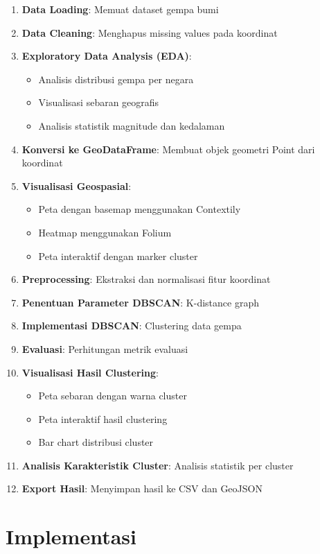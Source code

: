 \documentclass[12pt,a4paper]{article}
\begin{document}
\begin{enumerate}
    \item \textbf{Data Loading}: Memuat dataset gempa bumi
    \item \textbf{Data Cleaning}: Menghapus missing values pada koordinat
    \item \textbf{Exploratory Data Analysis (EDA)}:
    \begin{itemize}
        \item Analisis distribusi gempa per negara
        \item Visualisasi sebaran geografis
        \item Analisis statistik magnitude dan kedalaman
    \end{itemize}
    \item \textbf{Konversi ke GeoDataFrame}: Membuat objek geometri Point dari koordinat
    \item \textbf{Visualisasi Geospasial}:
    \begin{itemize}
        \item Peta dengan basemap menggunakan Contextily
        \item Heatmap menggunakan Folium
        \item Peta interaktif dengan marker cluster
    \end{itemize}
    \item \textbf{Preprocessing}: Ekstraksi dan normalisasi fitur koordinat
    \item \textbf{Penentuan Parameter DBSCAN}: K-distance graph
    \item \textbf{Implementasi DBSCAN}: Clustering data gempa
    \item \textbf{Evaluasi}: Perhitungan metrik evaluasi
    \item \textbf{Visualisasi Hasil Clustering}:
    \begin{itemize}
        \item Peta sebaran dengan warna cluster
        \item Peta interaktif hasil clustering
        \item Bar chart distribusi cluster
    \end{itemize}
    \item \textbf{Analisis Karakteristik Cluster}: Analisis statistik per cluster
    \item \textbf{Export Hasil}: Menyimpan hasil ke CSV dan GeoJSON
\end{enumerate}

\section{Implementasi}
\end{document}
